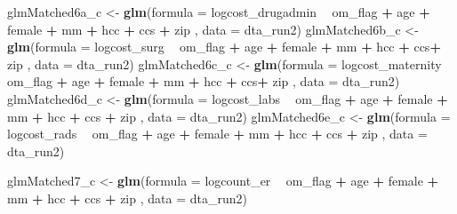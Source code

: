 \documentclass[]{article}
\newenvironment{Shaded}{\begin{snugshade}}{\end{snugshade}}
\newcommand{\KeywordTok}[1]{\textcolor[rgb]{0.13,0.29,0.53}{\textbf{#1}}}
\newcommand{\DataTypeTok}[1]{\textcolor[rgb]{0.13,0.29,0.53}{#1}}
\newcommand{\StringTok}[1]{\textcolor[rgb]{0.31,0.60,0.02}{#1}}
\newcommand{\OperatorTok}[1]{\textcolor[rgb]{0.81,0.36,0.00}{\textbf{#1}}}
\newcommand{\NormalTok}[1]{#1}
\begin{document}
\begin{Shaded}
\begin{Highlighting}[]
\NormalTok{glmMatched6a_c <-}\StringTok{ }\KeywordTok{glm}\NormalTok{(}\DataTypeTok{formula =}\NormalTok{ logcost_drugadmin }\OperatorTok{~}\StringTok{ }\NormalTok{om_flag }\OperatorTok{+}\StringTok{ }\NormalTok{age }\OperatorTok{+}\StringTok{ }\NormalTok{female }\OperatorTok{+}\StringTok{ }\NormalTok{mm }\OperatorTok{+}\StringTok{ }\NormalTok{hcc }\OperatorTok{+}\StringTok{ }\NormalTok{ccs }\OperatorTok{+}\StringTok{ }\NormalTok{zip ,}
                    \DataTypeTok{data    =}\NormalTok{ dta_run2)}
\NormalTok{glmMatched6b_c <-}\StringTok{ }\KeywordTok{glm}\NormalTok{(}\DataTypeTok{formula =}\NormalTok{ logcost_surg }\OperatorTok{~}\StringTok{ }\NormalTok{om_flag }\OperatorTok{+}\StringTok{ }\NormalTok{age }\OperatorTok{+}\StringTok{ }\NormalTok{female }\OperatorTok{+}\StringTok{ }\NormalTok{mm }\OperatorTok{+}\StringTok{ }\NormalTok{hcc }\OperatorTok{+}\StringTok{ }\NormalTok{ccs}\OperatorTok{+}\StringTok{ }\NormalTok{zip  ,}
                    \DataTypeTok{data    =}\NormalTok{ dta_run2)}
\NormalTok{glmMatched6c_c <-}\StringTok{ }\KeywordTok{glm}\NormalTok{(}\DataTypeTok{formula =}\NormalTok{ logcost_maternity }\OperatorTok{~}\StringTok{ }\NormalTok{om_flag }\OperatorTok{+}\StringTok{ }\NormalTok{age }\OperatorTok{+}\StringTok{ }\NormalTok{female }\OperatorTok{+}\StringTok{ }\NormalTok{mm }\OperatorTok{+}\StringTok{ }\NormalTok{hcc }\OperatorTok{+}\StringTok{ }\NormalTok{ccs}\OperatorTok{+}\StringTok{ }\NormalTok{zip  ,}
                    \DataTypeTok{data    =}\NormalTok{ dta_run2)}
\NormalTok{glmMatched6d_c <-}\StringTok{ }\KeywordTok{glm}\NormalTok{(}\DataTypeTok{formula =}\NormalTok{ logcost_labs }\OperatorTok{~}\StringTok{ }\NormalTok{om_flag }\OperatorTok{+}\StringTok{ }\NormalTok{age }\OperatorTok{+}\StringTok{ }\NormalTok{female }\OperatorTok{+}\StringTok{ }\NormalTok{mm }\OperatorTok{+}\StringTok{ }\NormalTok{hcc }\OperatorTok{+}\StringTok{ }\NormalTok{ccs }\OperatorTok{+}\StringTok{ }\NormalTok{zip ,}
                    \DataTypeTok{data    =}\NormalTok{ dta_run2)}
\NormalTok{glmMatched6e_c <-}\StringTok{ }\KeywordTok{glm}\NormalTok{(}\DataTypeTok{formula =}\NormalTok{ logcost_rads }\OperatorTok{~}\StringTok{ }\NormalTok{om_flag }\OperatorTok{+}\StringTok{ }\NormalTok{age }\OperatorTok{+}\StringTok{ }\NormalTok{female }\OperatorTok{+}\StringTok{ }\NormalTok{mm }\OperatorTok{+}\StringTok{ }\NormalTok{hcc }\OperatorTok{+}\StringTok{ }\NormalTok{ccs }\OperatorTok{+}\StringTok{ }\NormalTok{zip ,}
                    \DataTypeTok{data    =}\NormalTok{ dta_run2)}


\NormalTok{glmMatched7_c <-}\StringTok{ }\KeywordTok{glm}\NormalTok{(}\DataTypeTok{formula =}\NormalTok{ logcount_er }\OperatorTok{~}\StringTok{ }\NormalTok{om_flag }\OperatorTok{+}\StringTok{ }\NormalTok{age }\OperatorTok{+}\StringTok{ }\NormalTok{female }\OperatorTok{+}\StringTok{ }\NormalTok{mm }\OperatorTok{+}\StringTok{ }\NormalTok{hcc }\OperatorTok{+}\StringTok{ }\NormalTok{ccs }\OperatorTok{+}\StringTok{ }\NormalTok{zip ,}
                   \DataTypeTok{data    =}\NormalTok{ dta_run2)}



\end{Highlighting}
\end{Shaded}
\end{document}
